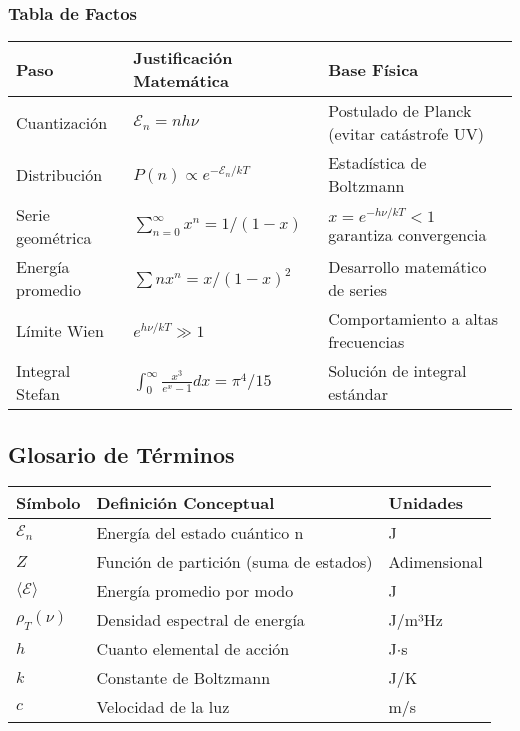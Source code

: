 \documentclass{article}
\begin{document}
	\subsubsection*{Tabla de Factos}
	\begin{tabular}{p{3cm}p{6cm}p{5cm}}
		\toprule
		\textbf{Paso} & \textbf{Justificación Matemática} & \textbf{Base Física} \\
		\midrule
		Cuantización & \(\mathcal{E}_n = nh\nu\) & Postulado de Planck (evitar catástrofe UV) \\
		Distribución & \(P(n) \propto e^{-\mathcal{E}_n/kT}\) & Estadística de Boltzmann \\
		Serie geométrica & \(\sum_{n=0}^\infty x^n = 1/(1-x)\) & \(x = e^{-h\nu/kT} < 1\) garantiza convergencia \\
		Energía promedio & \(\sum n x^n = x/(1-x)^2\) & Desarrollo matemático de series \\
		Límite Wien & \(e^{h\nu/kT} \gg 1\) & Comportamiento a altas frecuencias \\
		Integral Stefan & \(\int_0^\infty \frac{x^3}{e^x - 1}dx = \pi^4/15\) & Solución de integral estándar \\
		\bottomrule
	\end{tabular}
	
	\subsection*{Glosario de Términos}
	\begin{tabular}{p{2.5cm}p{4cm}p{3cm}}
		\toprule
		\textbf{Símbolo} & \textbf{Definición Conceptual} & \textbf{Unidades} \\
		\midrule
		\(\mathcal{E}_n\) & Energía del estado cuántico n & J \\
		\(Z\) & Función de partición (suma de estados) & Adimensional \\
		\(\langle \mathcal{E} \rangle\) & Energía promedio por modo & J \\
		\(\rho_T(\nu)\) & Densidad espectral de energía & J/m³Hz \\
		\(h\) & Cuanto elemental de acción & J$\cdot$s \\
		\(k\) & Constante de Boltzmann & J/K \\
		\(c\) & Velocidad de la luz & m/s \\
		\bottomrule
	\end{tabular}
	
\end{document}
